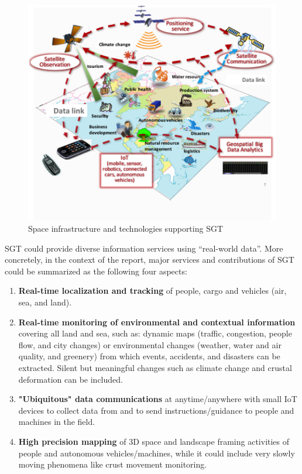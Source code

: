 \begin{figure}[H]
\begin{center}
\includegraphics[width = 0.8\linewidth]{Figures/sgt.png}
\end{center}
\caption{Space infrastructure and technologies supporting SGT}
\label{sgt}
\end{figure}

SGT could provide diverse information services using “real-world data”. More concretely, in the context of the report, major services and contributions of SGT could be summarized as the following four aspects:

\begin{enumerate}

\item \textbf{Real-time localization and tracking} of people, cargo and vehicles (air, sea, and land).

\item \textbf{Real-time monitoring of environmental and contextual information} covering all land and sea, such as: dynamic maps (traffic, congestion, people flow, and city changes) or environmental changes (weather, water and air quality, and greenery) from which events, accidents, and disasters can be extracted. Silent but meaningful changes such as climate change and crustal deformation can be included.

\item \textbf{"Ubiquitous" data communications} at anytime/anywhere with small IoT devices to collect data from and to send instructions/guidance to people and machines in the field.

\item \textbf{High precision mapping} of 3D space and landscape framing activities of people and autonomous vehicles/machines, while it could include very slowly moving phenomena like crust movement monitoring.

\end{enumerate}



